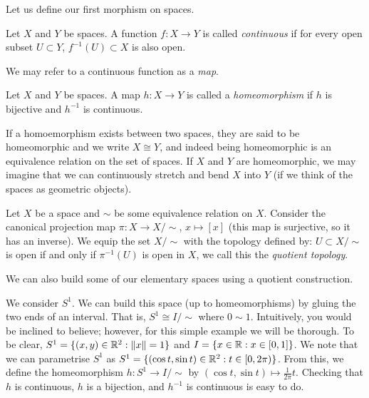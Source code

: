 Let us define our first morphism on spaces.

\begin{definition}[Continuous]
  Let $X$ and $Y$ be spaces. A function $f: X \to Y$ is called \emph{continuous} if for every open subset $U \subset Y$, $f^{-1}(U) \subset X$ is also open.
\end{definition}

We may refer to a continuous function as a \emph{map}.

\begin{definition}[Homeomorphism]
  Let $X$ and $Y$ be spaces. A map $h: X \to Y$ is called a \emph{homeomorphism} if $h$ is bijective and $h^{-1}$ is continuous.
\end{definition}

If a homoemorphism exists between two spaces, they are said to be homeomorphic and we write $X \cong Y$, and indeed being homeomorphic is an equivalence relation on the set of spaces. If $X$ and $Y$ are homeomorphic, we may imagine that we can continuously stretch and bend $X$ into $Y$ (if we think of the spaces as geometric objects).

\begin{definition}
  Let $X$ be a space and $\sim$ be some equivalence relation on $X$. Consider the canonical projection map $\pi: X \to X/{\sim}$, $x \mapsto [x]$ (this map is surjective, so it has an inverse). We equip the set $X/{\sim}$ with the topology defined by: $U \subset X/{\sim}$ is open if and only if $\pi^{-1}(U)$ is open in $X$, we call this the \emph{quotient topology}.
\end{definition}

We can also build some of our elementary spaces using a quotient construction.

\begin{example}
  We consider $S^1$. We can build this space (up to homeomorphisms) by gluing the two ends of an interval. That is, $S^1 \cong I/{\sim}$ where $0 \sim 1$. Intuitively, you would be inclined to believe; however, for this simple example we will be thorough. To be clear, $S^1 = \{(x,y) \in \mathbb R^2: \lVert x \rVert = 1\}$ and $I = \{x \in \mathbb R: x \in [0,1]\}$. We note that we can parametrise $S^1$ as $S^1 = \{(\cos t, \sin t) \in \mathbb R^2: t \in [0, 2\pi)\}$. From this, we define the homeomorphism $h: S^1 \to I/{\sim}$ by $(\cos t, \sin t) \mapsto \frac1{2\pi}t$. Checking that $h$ is continuous, $h$ is a bijection, and $h^{-1}$ is continuous is easy to do.
\end{example}

